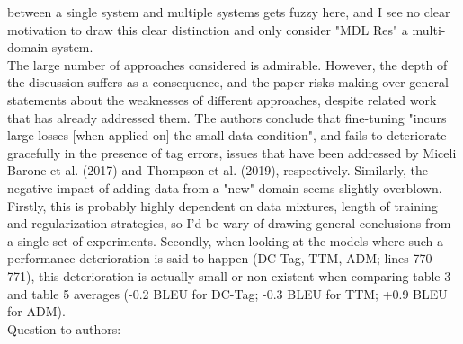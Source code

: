 \documentclass[12pt,times,a4paper,twoside]{article}
\theoremstyle{definition}
\begin{document}
between a single system and multiple systems gets fuzzy here, and I see no clear motivation to draw this clear distinction and only consider "MDL Res" a multi-domain system.
\\
The large number of approaches considered is admirable. However, the depth of the discussion suffers as a consequence, and the paper risks making over-general statements about the weaknesses of different approaches, despite related work that has already addressed them. The authors conclude that fine-tuning "incurs large losses [when applied on] the small data condition", and fails to deteriorate gracefully in the presence of tag errors, issues that have been addressed by Miceli Barone et al. (2017) and Thompson et al. (2019), respectively. Similarly, the negative impact of adding data from a "new" domain seems slightly overblown. Firstly, this is probably highly dependent on data mixtures, length of training and regularization strategies, so I'd be wary of drawing general conclusions from a single set of experiments. Secondly, when looking at the models where such a performance deterioration is said to happen (DC-Tag, TTM, ADM; lines
770-771), this deterioration is actually small or non-existent when
comparing table 3 and table 5 averages (-0.2 BLEU for DC-Tag; -0.3 BLEU for TTM; +0.9 BLEU for ADM).
\\
\noindent Question to authors:
\end{document}
